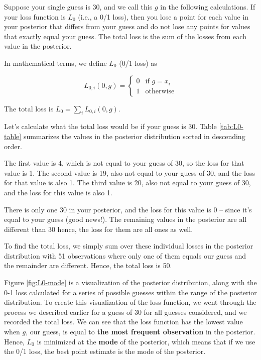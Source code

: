 \documentclass[]{book}
\theoremstyle{definition}
\theoremstyle{definition}
\theoremstyle{definition}
\theoremstyle{remark}
\begin{document}
Suppose your single guess is 30, and we call this \(g\) in the following
calculations. If your loss function is \(L_0\) (i.e., a 0/1 loss), then
you lose a point for each value in your posterior that differs from your
guess and do not lose any points for values that exactly equal your
guess. The total loss is the sum of the losses from each value in the
posterior.

In mathematical terms, we define \(L_0\) (0/1 loss) as

\[L_{0,i}(0,g) = \left\{ \begin{array}{cc}
0 & \text{if } g=x_i \\ 1 & \text{otherwise}
\end{array}\right.\]

The total loss is \(L_0 = \sum_i L_{0,i}(0,g)\).

Let's calculate what the total loss would be if your guess is 30. Table
\ref{tab:L0-table} summarizes the values in the posterior distribution
sorted in descending order.

The first value is 4, which is not equal to your guess of 30, so the
loss for that value is 1. The second value is 19, also not equal to your
guess of 30, and the loss for that value is also 1. The third value is
20, also not equal to your guess of 30, and the loss for this value is
also 1.

There is only one 30 in your posterior, and the loss for this value is 0
-- since it's equal to your guess (good news!). The remaining values in
the posterior are all different than 30 hence, the loss for them are all
ones as well.

To find the total loss, we simply sum over these individual losses in
the posterior distribution with 51 observations where only one of them
equals our guess and the remainder are different. Hence, the total loss
is 50.

Figure \ref{fig:L0-mode} is a visualization of the posterior
distribution, along with the 0-1 loss calculated for a series of
possible guesses within the range of the posterior distribution. To
create this visualization of the loss function, we went through the
process we described earlier for a guess of 30 for all guesses
considered, and we recorded the total loss. We can see that the loss
function has the lowest value when \(g\), our guess, is equal to
\textbf{the most frequent observation} in the posterior. Hence, \(L_0\)
is minimized at the \textbf{mode} of the posterior, which means that if
we use the 0/1 loss, the best point estimate is the mode of the
posterior.
\end{document}
